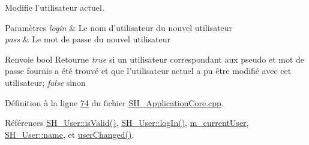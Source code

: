 Modifie l'utilisateur actuel. 


\begin{DoxyParams}{Paramètres}
{\em login} & Le nom d'utilisateur du nouvel utilisateur \\
\hline
{\em pass} & Le mot de passe du nouvel utilisateur \\
\hline
\end{DoxyParams}
\begin{DoxyReturn}{Renvoie}
bool Retourne {\itshape true} si un utilisateur correspondant aux pseudo et mot de passe fournis a été trouvé et que l'utilisateur actuel a pu être modifié avec cet utilisateur; {\itshape false} sinon 
\end{DoxyReturn}


Définition à la ligne \hyperlink{SH__ApplicationCore_8cpp_source_l00074}{74} du fichier \hyperlink{SH__ApplicationCore_8cpp_source}{S\-H\-\_\-\-Application\-Core.\-cpp}.



Références \hyperlink{classSH__User_a07de5c02b2a02b3bb2b0aaf0886bb4d9}{S\-H\-\_\-\-User\-::is\-Valid()}, \hyperlink{classSH__User_a98e3e3ca706a6988e6d7af23ce8bb82a}{S\-H\-\_\-\-User\-::log\-In()}, \hyperlink{classSH__ApplicationCore_a2bd2432939b96af2a1003630df83da63}{m\-\_\-current\-User}, \hyperlink{classSH__User_ae32b20d52e62ec32c1f335006f52214e}{S\-H\-\_\-\-User\-::name}, et \hyperlink{classSH__ApplicationCore_aeeac6cde618cb677218d72c4ea7ecf18}{user\-Changed()}.


